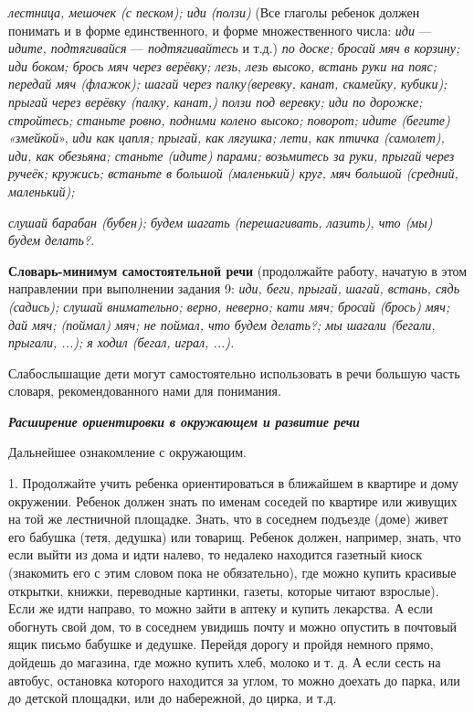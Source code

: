 \documentclass[a5paper]{book}
\renewcommand{\emph}[1]{\textit{#1}}
\begin{document}
\emph{лестница, мешочек (с песком); иди (ползи)} (Все глаголы ребенок
должен понимать и в форме единственного, и форме множественного числа:
\emph{иди} --- \emph{идите, подтягивайся} --- \emph{подтягивайтесь} и
т.д.) \emph{по доске; бросай мяч} \emph{в корзину; иди боком; брось мяч
через верёвку; лезь, лезь высоко,} \emph{встань руки на пояс; передай
мяч (флажок); шагай через палку(веревку, канат, скамейку, кубики);
прыгай через верёвку (палку, канат,) ползи под веревку; иди по дорожке;
стройтесь; станьте ровно, подними колено высоко; поворот; идите (бегите)
«змейкой}», \emph{иди как} \emph{цапля; прыгай, как лягушка; лети, как
птичка (самолет), иди, как обезьяна; станьте (идите) парами; возьмитесь
за руки, прыгай} \emph{через ручеёк; кружись; встаньте в большой
(маленький) круг, мяч большой (средний, маленький);}

\emph{слушай барабан (бубен); будем шагать (перешагивать, лазить), что
(мы) будем делать?.}

\textbf{Словарь-минимум самостоятельной речи} (продолжайте работу,
начатую в этом направлении при выполнении задания 9: \emph{иди, беги,}
\emph{прыгай,} \emph{шагай, встань, сядь (садись); слушай внимательно;
верно, неверно; кати мяч; бросай (брось) мяч; дай мяч; (поймал) мяч; не
поймал, что будем делать?; мы шагали (бегали, прыгали, ...); я ходил
(бегал, играл, ...).}

Слабослышащие дети могут самостоятельно использовать в речи большую
часть словаря, рекомендованного нами для понимания.

\emph{\textbf{Расширение ориентировки в окружающем и развитие речи}}

Дальнейшее ознакомление с окружающим.

1. Продолжайте учить ребенка ориентироваться в ближайшем в квартире и
дому окружении. Ребенок должен знать по именам соседей по квартире или
живущих на той же лестничной площадке. Знать, что в соседнем подъезде
(доме) живет его бабушка (тетя, дедушка) или товарищ. Ребенок должен,
например, знать, что если выйти из дома и идти налево, то недалеко
находится газетный киоск (знакомить его с этим словом пока не
обязательно), где можно купить красивые открытки, книжки, переводные
картинки, газеты, которые читают взрослые). Если же идти направо, то
можно зайти в аптеку и купить лекарства. А если обогнуть свой дом, то в
соседнем увидишь почту и можно опустить в почтовый ящик письмо бабушке и
дедушке. Перейдя дорогу и пройдя немного прямо, дойдешь до магазина, где
можно купить хлеб, молоко и т. д. А если сесть на автобус, остановка
которого находится за углом, то можно доехать до парка, или до детской
площадки, или до набережной, до цирка, и т.д.
\end{document}
